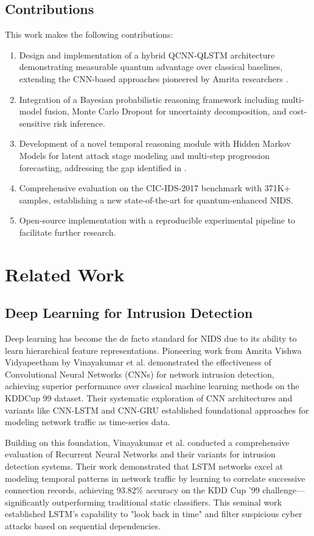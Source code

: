 \documentclass[conference]{IEEEtran}
\begin{document}
\subsection{Contributions}
This work makes the following contributions:
\begin{enumerate}
    \item Design and implementation of a hybrid QCNN-QLSTM architecture demonstrating measurable quantum advantage over classical baselines, extending the CNN-based approaches pioneered by Amrita researchers \cite{vinayakumar2017applying, vigneswaran2018evaluating}.
    \item Integration of a Bayesian probabilistic reasoning framework including multi-model fusion, Monte Carlo Dropout for uncertainty decomposition, and cost-sensitive risk inference.
    \item Development of a novel temporal reasoning module with Hidden Markov Models for latent attack stage modeling and multi-step progression forecasting, addressing the gap identified in \cite{vigneswaran2020compendium}.
    \item Comprehensive evaluation on the CIC-IDS-2017 benchmark with 371K+ samples, establishing a new state-of-the-art for quantum-enhanced NIDS.
    \item Open-source implementation with a reproducible experimental pipeline to facilitate further research.
\end{enumerate}

\section{Related Work}

\subsection{Deep Learning for Intrusion Detection}
Deep learning has become the de facto standard for NIDS due to its ability to learn hierarchical feature representations. Pioneering work from Amrita Vishwa Vidyapeetham by Vinayakumar et al. \cite{vinayakumar2017applying} demonstrated the effectiveness of Convolutional Neural Networks (CNNs) for network intrusion detection, achieving superior performance over classical machine learning methods on the KDDCup 99 dataset. Their systematic exploration of CNN architectures and variants like CNN-LSTM and CNN-GRU established foundational approaches for modeling network traffic as time-series data.

Building on this foundation, Vinayakumar et al. \cite{vinayakumar2017rnn} conducted a comprehensive evaluation of Recurrent Neural Networks and their variants for intrusion detection systems. Their work demonstrated that LSTM networks excel at modeling temporal patterns in network traffic by learning to correlate successive connection records, achieving 93.82\% accuracy on the KDD Cup '99 challenge—significantly outperforming traditional static classifiers. This seminal work established LSTM's capability to "look back in time" and filter suspicious cyber attacks based on sequential dependencies.
\end{document}
